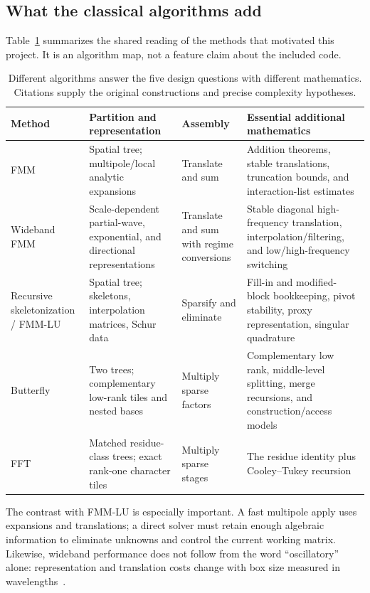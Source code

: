 \documentclass[11pt,a4paper]{article}
\begin{document}
\subsection{What the classical algorithms add}
Table~\ref{tab:algorithm-map} summarizes the shared reading of the methods that motivated this project. It is an algorithm map, not a feature claim about the included code.
\begin{table}[htbp]
\centering\footnotesize
\caption{Different algorithms answer the five design questions with different mathematics. Citations supply the original constructions and precise complexity hypotheses.}
\label{tab:algorithm-map}
\begin{tabularx}{\textwidth}{@{}>{\raggedright\arraybackslash}p{2.2cm}>{\raggedright\arraybackslash}X>{\raggedright\arraybackslash}p{2.5cm}>{\raggedright\arraybackslash}p{4.2cm}@{}}
\toprule
Method & Partition and representation & Assembly & Essential additional mathematics \\
\midrule
FMM & Spatial tree; multipole/local analytic expansions & Translate and sum & Addition theorems, stable translations, truncation bounds, and interaction-list estimates~\cite{greengard1987fmm}\\
Wideband FMM & Scale-dependent partial-wave, exponential, and directional representations & Translate and sum with regime conversions & Stable diagonal high-frequency translation, interpolation/filtering, and low/high-frequency switching~\cite{cheng2006wideband}\\
Recursive skeletonization / FMM-LU & Spatial tree; skeletons, interpolation matrices, Schur data & Sparsify and eliminate & Fill-in and modified-block bookkeeping, pivot stability, proxy representation, singular quadrature~\cite{ho2012hife,sushnikova2023fmmlu}\\
Butterfly & Two trees; complementary low-rank tiles and nested bases & Multiply sparse factors & Complementary low rank, middle-level splitting, merge recursions, and construction/access models~\cite{li2015butterfly,candes2009butterfly}\\
FFT & Matched residue-class trees; exact rank-one character tiles & Multiply sparse stages & The residue identity plus Cooley--Tukey recursion~\cite{cooley1965fft}\\
\bottomrule
\end{tabularx}
\end{table}

The contrast with FMM-LU is especially important. A fast multipole apply uses expansions and translations; a direct solver must retain enough algebraic information to eliminate unknowns and control the current working matrix. Likewise, wideband performance does not follow from the word ``oscillatory'' alone: representation and translation costs change with box size measured in wavelengths~\cite{cheng2006wideband}.
\end{document}
